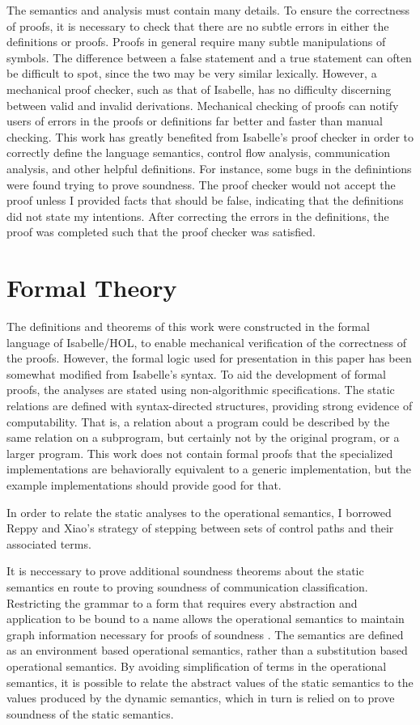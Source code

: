 \documentclass{article}
\begin{document}
The semantics and analysis must contain many details. To ensure the
correctness of proofs, it is necessary to check that there are no subtle errors in either the 
definitions or proofs. Proofs in general require many subtle manipulations of symbols. The
difference between a false statement and a true statement can often be difficult to spot, since
the two may be very similar lexically. However, a mechanical proof checker, such as that of 
Isabelle, has no difficulty discerning between valid and invalid derivations.
Mechanical checking of proofs can notify users of errors in the proofs or definitions far better
and faster than manual checking. This work has greatly benefited from Isabelle's proof checker in
order to correctly define the language semantics, control flow analysis, communication analysis,
and other helpful definitions. For instance, some bugs in the
definintions were found trying to prove
soundness. The proof checker would not accept the proof unless I provided facts that
should be false, indicating that the definitions did not state my intentions.
After correcting the errors in the definitions, the proof was completed such that the proof
checker was satisfied.

\section{Formal Theory}

The definitions and theorems of this work were constructed in the formal
language of Isabelle/HOL,
to enable mechanical verification of the correctness of the proofs.
However, the formal logic used
for presentation in this paper has been somewhat modified from Isabelle's syntax. 
To aid the development of formal proofs,
the analyses are stated using non-algorithmic specifications.
The static relations are defined
with syntax-directed structures, providing strong evidence of computability.
That is, a relation about a program could be described by the same relation on a subprogram,
but certainly not by the original program, or a larger program.
This work does not contain formal proofs that  the specialized implementations are
behaviorally equivalent to a generic implementation, but the example implementations
should provide good for that.

In order to relate the static analyses to the operational semantics, I
borrowed Reppy and Xiao's strategy of stepping between sets of control paths and
their associated terms.

It is neccessary to prove additional soundness theorems about the static semantics en route to
proving soundness of communication classification. Restricting the grammar to a form that
requires
every abstraction and application to be bound to a name allows the operational
semantics to maintain graph information necessary for proofs of soundness \cite{}.
The semantics are defined as an environment based operational semantics, rather than a
substitution based operational semantics. By avoiding simplification of terms in the
operational semantics, it is possible to relate
the abstract values of the static semantics to the
values produced by the dynamic semantics, which in turn is relied on to prove 
soundness of the static semantics.
\end{document}
